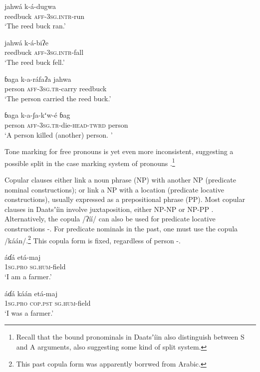 \documentclass[output=paper]{langsci/langscibook}
\begin{document}
\ea\label{ex:ahlandc:69}
\gll
jahw\'{a}        k-\'{a}-dugwa \\
reedbuck  \textsc{aff-3sg.intr}{}-run\\
\glt
‘The reed buck ran.’
\z

\ea\label{ex:ahlandc:70}
\gll
jahw\'{a}    k-\'{a}-biʔe\\
reedbuck    \textsc{aff-3sg.intr}{}-fall\\
\glt
‘The reed buck fell.’
\z

\ea\label{ex:ahlandc:71}
\gll
ɓaga     k-a-r\'{a}faʔa     jahwa\\
person   \textsc{aff-3sg.tr}{}-carry  reedbuck \\
\glt
‘The person carried the reed buck.’
\z

\ea\label{ex:ahlandc:72}
\gll
ɓaga     k-a-ʃa-kʻw-\'{e}  ɓag \\
person \textsc{aff-3sg.tr}{}-die-\textsc{head-twrd}   person\\
\glt
‘A person killed (another) person. ’
\z

Tone marking for free pronouns is yet even more inconsistent, suggesting a possible split in the case marking system of pronouns \citep{Kelly2014}.\footnote{Recall that the bound pronominals in Daatsʼ\'{i}in also distinguish between S and A arguments, also suggesting some kind of split system.} 

Copular clauses either link a noun phrase (NP) with another NP (predicate nominal constructions); or link a NP with a location (predicate locative constructions), usually expressed as a prepositional phrase (PP). Most copular clauses in Daatsʼ\'{i}in involve juxtaposition, either NP-NP  or NP-PP . Alternatively, the copula /ʔ\'{i}\'{i}/ can also be used for predicate locative constructions -. For predicate nominals in the past, one must use the copula /k\'{a}\'{a}n/.\footnote{This past copula form was apparently borrwed from Arabic.} This copula form is fixed, regardless of person -.

\ea\label{ex:ahlandc:73}
\gll
\'{a}ɗ\'{a}    et\'{a}-maj \\
\textsc{1sg.pro}    \textsc{sg.hum}{}-field\\
\glt
‘I am a farmer.’
\z

\ea\label{ex:ahlandc:74}
\gll
\'{a}ɗ\'{a}  k\'{a}\'{a}n  et\'{a}-maj \\
\textsc{1sg.pro}    \textsc{cop.pst} \textsc{sg.hum}{}-field \\
\glt
‘I was a farmer.’
\z
\end{document}
